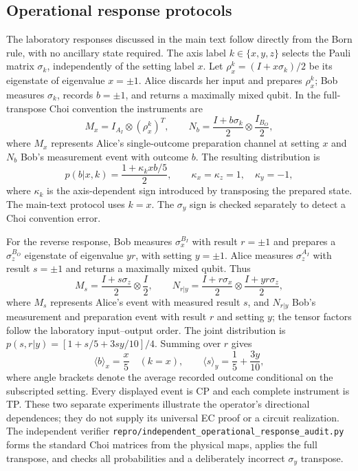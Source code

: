 \documentclass[11pt]{article}
\begin{document}
\subsection{Operational response protocols}
\label{sec:responses}
The laboratory responses discussed in the main text follow directly from the Born rule, with no ancillary state required. The axis label $k\in\{x,y,z\}$ selects the Pauli matrix $\sigma_k$, independently of the setting label $x$. Let $\rho_x^k=(I+x\sigma_k)/2$ be its eigenstate of eigenvalue $x=\pm1$. Alice discards her input and prepares $\rho_x^k$; Bob measures $\sigma_k$, records $b=\pm1$, and returns a maximally mixed qubit. In the full-transpose Choi convention the instruments are
\begin{equation}
 M_x=I_{A_I}\otimes(\rho_x^k)^T,\qquad
 N_b=\frac{I+b\sigma_k}{2}\otimes\frac{I_{B_O}}2,
 \label{eq:forward-instruments}
\end{equation}
where $M_x$ represents Alice's single-outcome preparation channel at setting $x$ and $N_b$ Bob's measurement event with outcome $b$. The resulting distribution is
\begin{equation}
 p(b|x,k)=\frac{1+\kappa_k x b/5}{2},\qquad
 \kappa_x=\kappa_z=1,\quad\kappa_y=-1,
 \label{eq:forward-response}
\end{equation}
where $\kappa_k$ is the axis-dependent sign introduced by transposing the prepared state. The main-text protocol uses $k=x$. The $\sigma_y$ sign is checked separately to detect a Choi convention error.

For the reverse response, Bob measures $\sigma_x^{B_I}$ with result $r=\pm1$ and prepares a $\sigma_z^{B_O}$ eigenstate of eigenvalue $yr$, with setting $y=\pm1$. Alice measures $\sigma_z^{A_I}$ with result $s=\pm1$ and returns a maximally mixed qubit. Thus
\begin{equation}
 M_s=\frac{I+s\sigma_z}{2}\otimes\frac I2,\qquad
 N_{r|y}=\frac{I+r\sigma_x}{2}\otimes\frac{I+yr\sigma_z}{2},
 \label{eq:reverse-instruments}
\end{equation}
where $M_s$ represents Alice's event with measured result $s$, and $N_{r|y}$ Bob's measurement and preparation event with result $r$ and setting $y$; the tensor factors follow the laboratory input--output order. The joint distribution is $p(s,r|y)=[1+s/5+3sy/10]/4$. Summing over $r$ gives
\begin{equation}
 \langle b\rangle_x=\frac{x}{5}\quad(k=x),\qquad
 \langle s\rangle_y=\frac15+\frac{3y}{10},
 \label{eq:directional-response}
\end{equation}
where angle brackets denote the average recorded outcome conditional on the subscripted setting. Every displayed event is CP and each complete instrument is TP. These two separate experiments illustrate the operator's directional dependences; they do not supply its universal EC proof or a circuit realization. The independent verifier \texttt{repro/independent\_operational\_response\_audit.py} forms the standard Choi matrices from the physical maps, applies the full transpose, and checks all probabilities and a deliberately incorrect $\sigma_y$ transpose.
\end{document}
